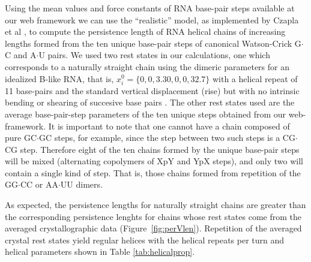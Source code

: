 Using  the mean  values and  force  constants of  RNA base-pair  steps
available at our web framework  we can use the ``realistic'' model, as
implemented  by  Czapla  et   al  \cite{czapla2006},  to  compute  the
persistence length of RNA  helical chains of increasing lengths formed
from  the  ten  unique   base-pair  steps  of  canonical  Watson-Crick
G$\cdot$C  and  A$\cdot$U pairs.   We  used  two  rest states  in  our
calculations,  one which  corresponds  to a  naturally straight  chain
using the  dimeric parameters  for an idealized  B-like RNA,  that is,
$x_{i}^{0} = \{0,  0, 3.30, 0, 0, 32.7\}$ with a  helical repeat of 11
base-pairs and  the standard vertical displacement (rise)  but with no
intrinsic    bending   or   shearing    of   succesive    base   pairs
\cite{chandrasekar1989, arnott1999}.   The other rest  states used are
the average base-pair-step parameters of the ten unique steps obtained
from our web-framework. It is important to note that one cannot have a
chain composed of pure GC$\cdot$GC  steps, for example, since the step
between two such  steps is a CG$\cdot$CG step.  Therefore eight of the
ten  chains  formed  by  the  unique base-pair  steps  will  be  mixed
(alternating  copolymers of  XpY and  YpX  steps), and  only two  will
contain  a single  kind of  step. That  is, those  chains  formed from
repetition of the GG$\cdot$CC or AA$\cdot$UU dimers.

As expected, the persistence lengths for naturally straight chains are
greater than  the corresponding  persistence lenghts for  chains whose
rest   states   come   from   the   averaged   crystallographic   data
(Figure~\ref{fig:perVlen}).  Repetition  of the averaged  crystal rest
states yield  regular helices  with the helical  repeats per  turn and
helical parameters shown in Table \ref{tab:helicalprop}.

